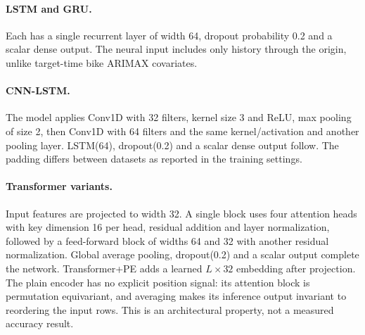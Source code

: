 \documentclass[10pt,a4paper]{article}
\begin{document}
\paragraph{LSTM and GRU.} Each has a single recurrent layer of width 64, dropout probability 0.2 and a scalar dense output. The neural input includes only history through the origin, unlike target-time bike ARIMAX covariates.

\paragraph{CNN-LSTM.} The model applies Conv1D with 32 filters, kernel size 3 and ReLU, max pooling of size 2, then Conv1D with 64 filters and the same kernel/activation and another pooling layer. LSTM(64), dropout(0.2) and a scalar dense output follow. The padding differs between datasets as reported in the training settings.

\paragraph{Transformer variants.} Input features are projected to width 32. A single block uses four attention heads with key dimension 16 per head, residual addition and layer normalization, followed by a feed-forward block of widths 64 and 32 with another residual normalization. Global average pooling, dropout(0.2) and a scalar output complete the network. Transformer+PE adds a learned $L\times32$ embedding after projection. The plain encoder has no explicit position signal: its attention block is permutation equivariant, and averaging makes its inference output invariant to reordering the input rows. This is an architectural property, not a measured accuracy result.
\end{document}
